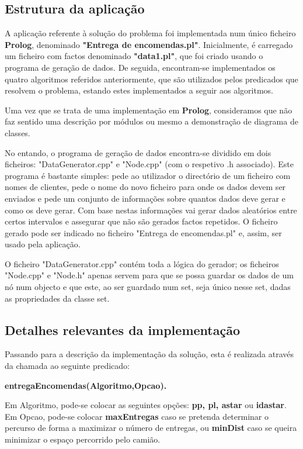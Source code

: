 \documentclass[a4paper]{article}
\begin{document}
\subsection{Estrutura da aplicação} 

A aplicação referente à solução do problema foi implementada num único ficheiro \textbf{Prolog}, denominado \textbf{"Entrega de encomendas.pl"}. Inicialmente, é carregado um ficheiro com factos denominado \textbf{"data1.pl"}, que foi criado usando o programa de geração de dados. De seguida, encontram-se implementados os quatro algoritmos referidos anteriormente, que são utilizados pelos predicados que resolvem o problema, estando estes implementados a seguir aos algoritmos.

Uma vez que se trata de uma implementação em \textbf{Prolog}, consideramos que não faz sentido uma descrição por módulos ou mesmo a demonstração de diagrama de classes.

No entando, o programa de geração de dados encontra-se dividido em dois ficheiros: "DataGenerator.cpp" e "Node.cpp" (com o respetivo .h associado).
Este programa é bastante simples: pede ao utilizador o directório de um ficheiro com nomes de clientes, pede o nome do novo ficheiro para onde os dados devem ser enviados e pede um conjunto de informações sobre quantos dados deve gerar e como os deve gerar. Com base nestas informações vai gerar dados aleatórios entre certos intervalos e assegurar que não são gerados factos repetidos.
O ficheiro gerado pode ser indicado no ficheiro "Entrega de encomendas.pl" e, assim, ser usado pela aplicação.

O ficheiro "DataGenerator.cpp" contém toda a lógica do gerador; os ficheiros "Node.cpp" e "Node.h" apenas servem para que se possa guardar os dados de um nó num objecto e que este, ao ser guardado num set, seja único nesse set, dadas as propriedades da classe set.

\subsection{Detalhes relevantes da implementação} 

Passando para a descrição da implementação da solução, esta é realizada através da chamada ao seguinte predicado:

\centerline{\textbf{entregaEncomendas(Algoritmo,Opcao).}}

Em Algoritmo, pode-se colocar as seguintes opções: \textbf{pp, pl, astar} ou \textbf{idastar}. Em Opcao, pode-se colocar \textbf{maxEntregas} caso se pretenda determinar o percurso de forma a maximizar o número de entregas, ou \textbf{minDist} caso se queira minimizar o espaço percorrido pelo camião.
\end{document}
